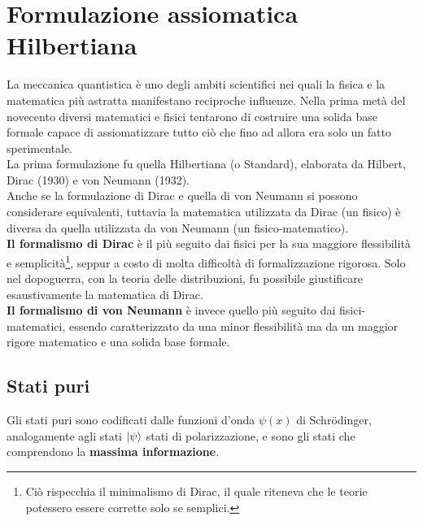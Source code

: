 \documentclass[FisicaTeorica.tex]{subfiles}
\begin{document}
\chapter{Formulazione assiomatica Hilbertiana}

La meccanica quantistica è uno degli ambiti scientifici nei quali la fisica e la matematica più astratta manifestano reciproche influenze. Nella prima metà del novecento diversi matematici e fisici tentarono di costruire una solida base formale capace di assiomatizzare tutto ciò che fino ad allora era solo un fatto sperimentale. \\
La prima formulazione fu quella Hilbertiana (o Standard), elaborata da Hilbert, Dirac (1930) e von Neumann (1932).\\ Anche se la formulazione di Dirac e quella di von Neumann si possono considerare equivalenti, tuttavia la matematica utilizzata da Dirac (un  fisico) è diversa da quella utilizzata da von Neumann (un fisico-matematico).\\
\textbf{Il formalismo di \textbf{Dirac}} è il più seguito dai fisici per la sua maggiore flessibilità e semplicità\footnote{Ciò rispecchia il minimalismo di Dirac, il quale riteneva che le teorie potessero essere corrette solo se semplici.}, seppur a costo di molta difficoltà di formalizzazione rigorosa. Solo nel dopoguerra, con la teoria delle distribuzioni, fu possibile giustificare esaustivamente la matematica di Dirac.\\
\textbf{Il formalismo di von Neumann} è invece quello più seguito dai fisici-matematici, essendo caratterizzato da una minor flessibilità ma da un maggior rigore matematico e una solida base formale.

\section{Stati puri}\label{sec:stati_puri}
Gli stati puri sono codificati dalle funzioni d'onda $\psi \left(x\right)$ di Schrödinger, analogamente agli stati $\ket{\psi}$ stati di polarizzazione, e sono gli stati che comprendono la \textbf{massima informazione}.
\end{document}
